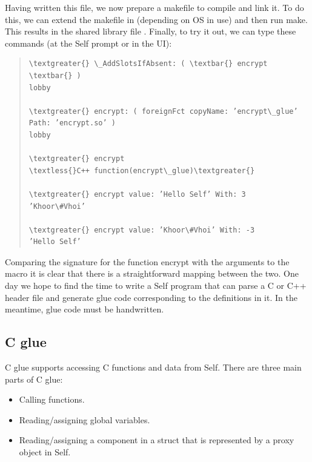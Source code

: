 \documentclass[letterpaper,10pt,english]{sphinxmanual}
\begin{document}
Having written this file, we now prepare a makefile to compile and link it. To do this, we can extend
the makefile in  (depending on OS in use) and then run make.
This results in the shared library file . Finally, to try it out, we can type these commands
(at the Self prompt or in the UI):
\begin{quote}

\begin{Verbatim}[commandchars=\\\{\}]
\textgreater{} \_AddSlotsIfAbsent: ( \textbar{} encrypt \textbar{} )
lobby

\textgreater{} encrypt: ( foreignFct copyName: ’encrypt\_glue’ Path: ’encrypt.so’ )
lobby

\textgreater{} encrypt
\textless{}C++ function(encrypt\_glue)\textgreater{}

\textgreater{} encrypt value: ’Hello Self’ With: 3
’Khoor\#Vhoi’

\textgreater{} encrypt value: ’Khoor\#Vhoi’ With: -3
’Hello Self’
\end{Verbatim}
\end{quote}

Comparing the signature for the function encrypt with the arguments to the  macro it
is clear that there is a straightforward mapping between the two. One day we hope to find the time
to write a Self program that can parse a C or C++ header file and generate glue code corresponding
to the definitions in it. In the meantime, glue code must be handwritten.


\subsection{C glue}
\label{vmref:c-glue}\label{vmref:index-68}
C glue supports accessing C functions and data from Self. There are three main parts of C glue:
\begin{itemize}
\item {} 
Calling functions.

\item {} 
Reading/assigning global variables.

\item {} 
Reading/assigning a component in a struct that is represented by a proxy object in Self.

\end{itemize}
\end{document}

